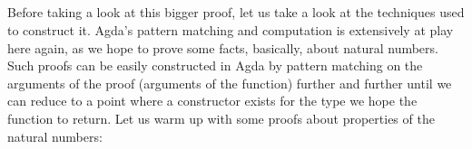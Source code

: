 {\begin{code}%
\>[0]\AgdaSpace{}%
\AgdaSymbol{:}%
\>[950I]\AgdaSymbol{(}\AgdaSpace{}%
\AgdaSymbol{:}\AgdaSpace{}%
\AgdaSymbol{)}\AgdaSpace{}%
\<%
\\
\>[.][@{}l@{}]\<[950I]%
\>[10]\AgdaSpace{}%
\AgdaSymbol{(}\AgdaSpace{}%
\AgdaSymbol{)}\AgdaSpace{}%
\AgdaSymbol{(}\AgdaSpace{}%
\AgdaSymbol{)}\<%
\\
%
\>[10]\<%
\\
%
\>[10]%
\>[958I]\AgdaSymbol{(}\AgdaSpace{}%
\AgdaSymbol{(}\AgdaSpace{}%
\AgdaSymbol{))}\<%
\\
\>[.][@{}l@{}]\<[958I]%
\>[27]\AgdaSymbol{(}\AgdaSpace{}%
\AgdaSymbol{(}\AgdaSpace{}%
\AgdaSymbol{))}\<%
\end{code}

Before taking a look at this bigger proof, let us take a look at the techniques used to construct it. Agda's pattern matching and computation is extensively at play here again, as we hope to prove some facts, basically, about natural numbers. Such proofs can be easily constructed in Agda by pattern matching on the arguments of the proof (arguments of the function) further and further until we can reduce to a point where a constructor exists for the type we hope the function to return. Let us warm up with some proofs about properties of the natural numbers:

}
